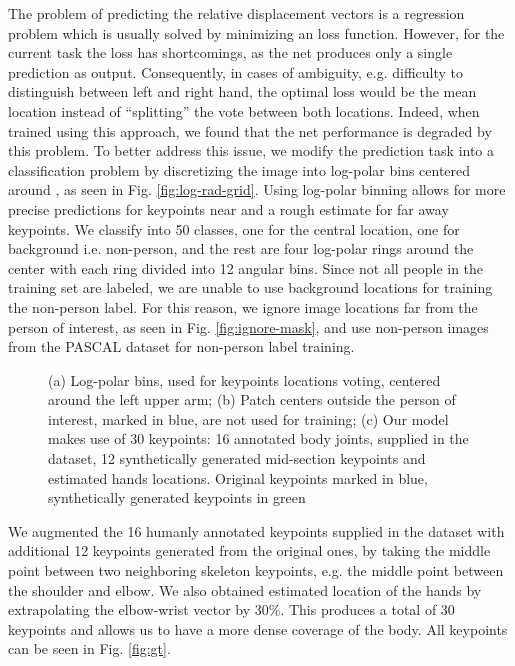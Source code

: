 \documentclass{article}
\begin{document}
The problem of predicting the relative displacement vectors  is a regression problem which is usually solved by minimizing an  loss function. However, for the current task the  loss has shortcomings, as the net produces only a single prediction as output. Consequently, in cases of ambiguity, e.g. difficulty to distinguish between left and right hand, the optimal  loss would be the mean location instead of ``splitting'' the vote between both locations. Indeed, when trained using this approach,  we found that the net performance is degraded by this problem. To better address this issue, we modify the prediction task into a classification problem by discretizing the image into log-polar bins centered around , as seen in Fig. \ref{fig:log-rad-grid}. Using log-polar binning allows for more precise predictions for keypoints near  and a rough estimate for far away keypoints. We classify into 50 classes, one for the central location, one for background i.e. non-person, and the rest are four log-polar rings around the center with each ring divided into 12 angular bins. Since not all people in the training set are labeled, we are unable to use background locations for training the non-person label. For this reason, we ignore image locations far from the person of interest, as seen in Fig. \ref{fig:ignore-mask}, and use non-person images from the PASCAL dataset for non-person label training. \\ 

\begin{figure}[ht]
	\centering
\caption{(a) Log-polar bins, used for keypoints locations voting, centered around the left upper arm; (b) Patch centers outside the person of interest, marked in blue, are not used for training; (c) Our model makes use of 30 keypoints: 16 annotated body joints, supplied in the dataset, 12 synthetically generated mid-section keypoints and estimated hands locations. Original keypoints marked in blue, synthetically generated keypoints in green }
	\label{fig:intro}
\end{figure}

We augmented the 16 humanly annotated keypoints supplied in the dataset with additional 12 keypoints generated from the original ones, by taking the middle point between two neighboring skeleton keypoints, e.g. the middle point between the shoulder and elbow. We also obtained estimated location of the hands by extrapolating the elbow-wrist vector by 30\%. This produces a total of 30 keypoints and allows us to have a more dense coverage of the body. All keypoints can be seen in Fig. \ref{fig:gt}. \\
\end{document}
